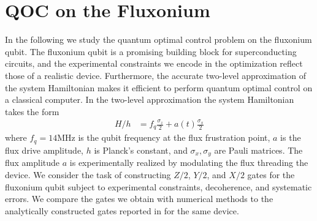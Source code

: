 \section{QOC on the Fluxonium \label{sec:fluxonium}}
In the following we study
the quantum optimal control problem on the fluxonium qubit.
The fluxonium qubit is a promising building block for superconducting
circuits, and the experimental constraints we encode in the optimization reflect
those of a realistic device. Furthermore, the accurate
two-level approximation of the system Hamiltonian makes it
efficient to perform quantum optimal control on
a classical computer. In the two-level
approximation the system Hamiltonian takes the form
\begin{align}
  H/h &= f_{q} \frac{\sigma_{z}}{2} + a(t) \frac{\sigma_{x}}{2}
  \label{eq:hamiltonian}
\end{align}
where $f_{q} = 14$MHz is the qubit frequency at the flux frustration point,
$a$ is the flux drive amplitude, $h$ is Planck's constant, and $\sigma_{x}, \sigma_{y}$
are Pauli matrices. The flux amplitude $a$ is experimentally
realized by modulating the flux 
threading the device. We consider the task of constructing $Z/2$, $Y/2$, and $X/2$
gates for the fluxonium qubit subject to experimental constraints, decoherence, and
systematic errors. We compare the gates we obtain with numerical
methods to the analytically constructed gates reported in
\cite{zhang2020universal} for the same device.

